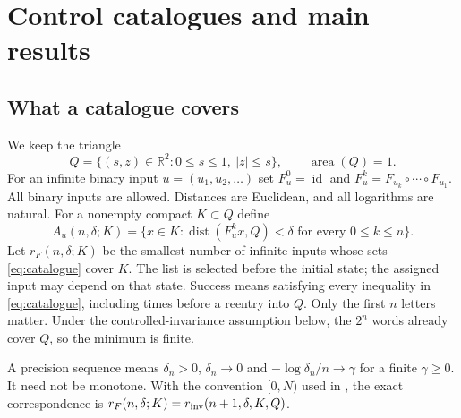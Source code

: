 \documentclass[11pt]{amsart}
\theoremstyle{definition}
\theoremstyle{remark}
\newcommand{\R}{\mathbb R}
\newcommand{\area}{\operatorname{area}}
\newcommand{\dist}{\operatorname{dist}}
\numberwithin{equation}{section}
\begin{document}
\section{Control catalogues and main results}\label{sec:planar}

\subsection{What a catalogue covers}
We keep the triangle
\[
Q=\{(s,z)\in\R^2:0\le s\le1,\ |z|\le s\},\qquad \area(Q)=1.
\]
For an infinite binary input $u=(u_1,u_2,\ldots)$ set
$F_u^0=\operatorname{id}$ and
$F_u^k=F_{u_k}\circ\cdots\circ F_{u_1}$.
All binary inputs are
allowed. Distances are Euclidean, and all logarithms are natural.
For a nonempty compact $K\subset Q$ define
\begin{equation}\label{eq:catalogue}
A_u(n,\delta;K)=\{x\in K:\dist(F_u^kx,Q)<\delta
                    \text{ for every }0\le k\le n\}.
\end{equation}
Let $r_F(n,\delta;K)$ be the smallest number of infinite inputs
whose sets \eqref{eq:catalogue} cover $K$. The list is selected
before the initial state; the assigned input
may depend on that state. Success means satisfying every inequality
in \eqref{eq:catalogue}, including times before a reentry into $Q$.
Only the first $n$ letters matter. Under the controlled-invariance
assumption below, the $2^n$ words already cover $Q$, so the minimum
is finite.

A precision sequence means $\delta_n>0$, $\delta_n\to0$ and
$-\log\delta_n/n\to\gamma$ for a finite $\gamma\ge0$.
It need not be monotone. With the convention $[0,N)$ used in
\cite[Section 2.2]{CZ2024}, the exact correspondence is
$r_F(n,\delta;K)=r_{\rm inv}(n+1,\delta,K,Q)$.
\end{document}
